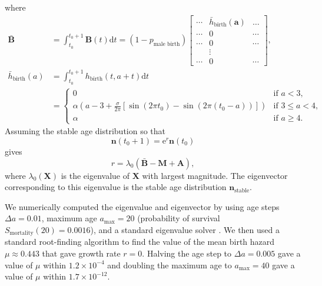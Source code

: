 \documentclass{article}
\renewcommand{\vec}[1]{\mathbf{#1}}
\newcommand{\mat}[1]{\mathbf{#1}}
\newcommand{\md}{\mathrm{d}}
\newcommand{\me}{\mathrm{e}}
\begin{document}
where
\begin{equation}
  \begin{split}
    \bar{\mat{B}} &=
    \int_{t_0}^{t_0 + 1} \mat{B}(t) \md t =
    (1 - p_{\text{male birth}})
    \begin{bmatrix}
      \cdots & \bar{h}_{\text{birth}}(\vec{a}) & \dots
      \\
      \cdots & 0 & \cdots
      \\
      \cdots & 0 & \cdots
      \\
      & \vdots &
      \\
      \cdots & 0 & \cdots
    \end{bmatrix},
    \\
    \bar{h}_{\text{birth}}(a) &=
    \int_{t_0}^{t_0 + 1} h_{\text{birth}}(t, a + t) \md t
    \\
    &=
    \begin{cases}
      0 & \text{if $a < 3$},
      \\
      \alpha \left(
        a - 3 + \frac{\sigma}{2 \pi}
        \left[
          \sin\left(2\pi t_0\right)
          - \sin\left(2 \pi (t_0 - a)\right)
        \right]
      \right)
      & \text{if $3 \leq a < 4$},
      \\
      \alpha & \text{if $a \geq 4$}.
    \end{cases}
  \end{split}
\end{equation}
Assuming the stable age distribution so that
\begin{equation}
  \vec{n}(t_0 + 1) = \me^r \vec{n}(t_0)
\end{equation}
gives
\begin{equation}
  r = \lambda_0\left(\bar{\mat{B}} - \mat{M} + \mat{A}\right),
\end{equation}
where $\lambda_0(\mat{X})$ is the eigenvalue of $\mat{X}$ with largest
magnitude.  The eigenvector corresponding to this eigenvalue is the
stable age distribution $\vec{n}_{\text{stable}}$.

We numerically computed the eigenvalue and eigenvector by using age
steps $\Delta a = 0.01$, maximum age $a_{\text{max}} = 20$
(probability of survival $S_{\text{mortality}}(20) = 0.0016$), and a
standard eigenvalue solver
\citep[\texttt{numpy.linalg.eig},][]{scipy}.  We then used a standard
root-finding algorithm
\citep[\texttt{scipy.optimize.fsolve},][]{scipy} to find the value of
the mean birth hazard $\mu \approx 0.443$ that gave growth rate
$r = 0$.  Halving the age step to $\Delta a = 0.005$ gave a value of
$\mu$ within $1.2 \times 10^{-4}$ and doubling the maximum age to
$a_{\text{max}} = 40$ gave a value of $\mu$ within
$1.7 \times 10^{-12}$.
\end{document}
